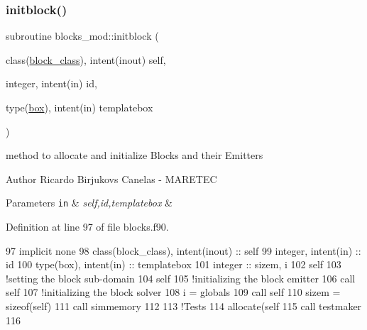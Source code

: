 \subsubsection{\texorpdfstring{initblock()}{initblock()}}
{\footnotesize\ttfamily subroutine blocks\+\_\+mod\+::initblock (\begin{DoxyParamCaption}\item[{class(\mbox{\hyperlink{structblocks__mod_1_1block__class}{block\+\_\+class}}), intent(inout)}]{self,  }\item[{integer, intent(in)}]{id,  }\item[{type(\mbox{\hyperlink{structgeometry__mod_1_1box}{box}}), intent(in)}]{templatebox }\end{DoxyParamCaption})\hspace{0.3cm}{\ttfamily [private]}}



method to allocate and initialize Blocks and their Emitters 

\begin{DoxyAuthor}{Author}
Ricardo Birjukovs Canelas -\/ M\+A\+R\+E\+T\+EC 
\end{DoxyAuthor}

\begin{DoxyParams}[1]{Parameters}
\mbox{\tt in}  & {\em self,id,templatebox} & \\
\hline
\end{DoxyParams}


Definition at line 97 of file blocks.\+f90.


\begin{DoxyCode}
97     \textcolor{keywordtype}{implicit none}
98     \textcolor{keywordtype}{class}(block\_class), \textcolor{keywordtype}{intent(inout)} :: self
99     \textcolor{keywordtype}{integer}, \textcolor{keywordtype}{intent(in)} :: id
100     \textcolor{keywordtype}{type}(box), \textcolor{keywordtype}{intent(in)} :: templatebox
101     \textcolor{keywordtype}{integer} :: sizem, i
102     self%
103     \textcolor{comment}{!setting the block sub-domain}
104     self%
105     \textcolor{comment}{!initializing the block emitter}
106     \textcolor{keyword}{call }self%
107     \textcolor{comment}{!initializing the block solver}
108     i = globals%
109     \textcolor{keyword}{call }self%
110     sizem = sizeof(self)
111     \textcolor{keyword}{call }simmemory%
112 
113     \textcolor{comment}{!Tests}
114     \textcolor{keyword}{allocate}(self%
115     \textcolor{keyword}{call }testmaker%
116 
\end{DoxyCode}
\mbox{\label{namespaceblocks__mod_a7202fad0fdc07ff9111e61e3aa513af9}} 
